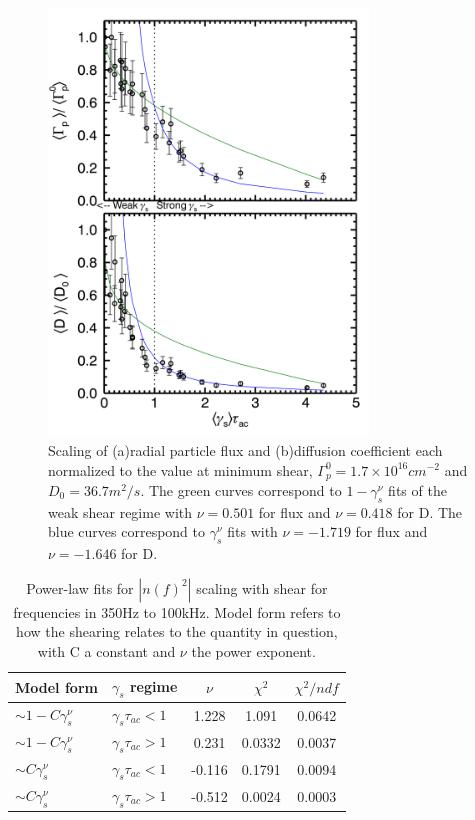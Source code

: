 \documentclass[aip,pop,amsmath,amssymb,reprint,superscriptaddress]{revtex4-1} %
\begin{document}
\begin{figure}[!htbp]
\centerline{
\includegraphics[width=8.5cm]{fluxandD}}
\caption{\label{fig:fluxandD} Scaling of (a)radial particle flux and (b)diffusion coefficient each normalized to the value at minimum shear, $\Gamma_{p}^{0} = 1.7\times10^{16} cm^{-2}$ and $D_{0} = 36.7 m^{2}/s$. The green curves correspond to $1-\gamma_{s}^{\nu}$ fits of the weak shear regime with $\nu = 0.501$ for flux and $\nu = 0.418$ for D. The blue curves correspond to $\gamma_{s}^{\nu}$ fits with $\nu = -1.719$ for flux and $\nu = -1.646$ for D.}
\end{figure}

\begin{table}
\caption{\label{tab:table1}Power-law fits for $|n(\textit{f})^{2}|$ scaling with shear for frequencies in 350Hz to 100kHz. Model form refers to how the shearing relates to the quantity in question, with C a constant and $\nu$ the power exponent.}
\begin{ruledtabular}
\begin{tabular}{llccc}
Model form&$\gamma_{s}$ regime&$\nu$&$\chi^2$&$\chi^2/ndf$\\
\hline
$\sim 1-C\gamma_{s}^\nu$&$\gamma_{s}\tau_{ac}<1$&1.228&1.091&0.0642\\
$\sim 1-C\gamma_{s}^\nu$&$\gamma_{s}\tau_{ac}>1$&0.231&0.0332&0.0037\\
$\sim C\gamma_{s}^\nu$&$\gamma_{s}\tau_{ac}<1$&-0.116&0.1791&0.0094\\
$\sim C\gamma_{s}^\nu$&$\gamma_{s}\tau_{ac}>1$&-0.512&0.0024&0.0003\\
\end{tabular}
\end{ruledtabular}
\end{table}
\end{document}
